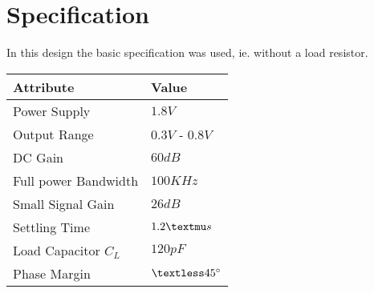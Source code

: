 \section{Specification}

In this design the basic specification was used, ie. without a load resistor.

\begin{table}[h]
	\centering
	\begin{tabular}{| l | l |}
		\hline
		Attribute			& Value			\\
		\hline
		Power Supply			& $1.8V$		\\
		Output Range			& $0.3V$ - $0.8V$	\\
		DC Gain				& $60dB$		\\
		Full power Bandwidth		& $100KHz$		\\
		Small Signal Gain		& $26dB$		\\
		Settling Time			& $1.2\textmu s$	\\
		Load Capacitor $C_{L}$		& $120pF$		\\
		Phase Margin			& $\textless 45^{\circ}$\\
		\hline
	\end{tabular}
\end{table}
		
